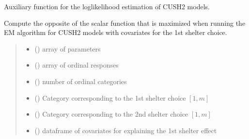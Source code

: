 \documentclass[letterpaper,10pt,english]{sphinxmanual}
\begin{document}
\begin{fulllineitems}
\label{\detokenize{cubmods:cubmods.cush2_x0.effe}}
\pysigstartsignatures
{}
\pysigstopsignatures
\sphinxAtStartPar
Auxiliary function for the log\sphinxhyphen{}likelihood estimation of CUSH2 models.

\sphinxAtStartPar
Compute the opposite of the scalar function that is maximized when running
the E\sphinxhyphen{}M algorithm for CUSH2 models with covariates for the 1st shelter choice.
\begin{quote}\begin{description}
\begin{itemize}
\item {} 
\sphinxAtStartPar
{} () \textendash{} array of parameters

\item {} 
\sphinxAtStartPar
{} () \textendash{} array of ordinal responses

\item {} 
\sphinxAtStartPar
{} () \textendash{} number of ordinal categories

\item {} 
\sphinxAtStartPar
{} () \textendash{} Category corresponding to the 1st shelter choice \([1,m]\)

\item {} 
\sphinxAtStartPar
{} () \textendash{} Category corresponding to the 2nd shelter choice \([1,m]\)

\item {} 
\sphinxAtStartPar
{} () \textendash{} dataframe of covariates for explaining the 1st shelter effect

\end{itemize}

\end{description}\end{quote}

\end{fulllineitems}
\end{document}
